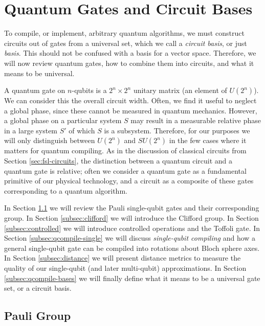 \section{Quantum Gates and Circuit Bases}
\label{sec:intro-basis}

To compile, or implement, arbitrary quantum algorithms, we must construct circuits
out of gates from a universal set, which we call a \emph{circuit basis},
or just \emph{basis}.
This should not be confused with a basis for a vector space.
Therefore, we will now review quantum gates, how to combine them into
circuits, and what it means to be universal.

A quantum gate on $n$-qubits is a $2^n \times 2^n$ unitary matrix
(an element of $U(2^n)$). We can consider this the overall circuit width.
Often, we find it useful to neglect a
global phase, since these cannot be measured in quantum mechanics.
However, a global
phase on a particular system $S$ may result in a measurable relative phase
in a large system $S'$ of which $S$ is a subsystem. Therefore, for our
purposes we will only distinguish between $U(2^n)$ and
$SU(2^n)$ in the few cases where it matters for
quantum compiling. As in the discussion of classical circuits from
Section \ref{sec:fsl-circuits}, the distinction between a quantum circuit
and a quantum gate is relative; often we consider a quantum gate as a
fundamental primitive of our physical technology, and a circuit as a
composite of these gates corresponding to a quantum algorithm.

In Section \ref{subsec:pauli} we
will review the Pauli single-qubit gates and their corresponding group.
In Section \ref{subsec:clifford} we will introduce the Clifford group.
In Section \ref{subsec:controlled} we will introduce controlled operations
and the Toffoli gate.
In Section \ref{subsec:qcompile-single} we will discuss \emph{single-qubit compiling}
and how a
general single-qubit gate can be compiled into rotations about Bloch sphere axes.
In Section \ref{subsec:distance} we will present distance metrics to
measure the quality of our single-qubit (and later multi-qubit) approximations.
In Section \ref{subsec:qcompile-bases} we will finally
define what it means to be a universal gate set, or a circuit basis.

\subsection{Pauli Group}
\label{subsec:pauli}


